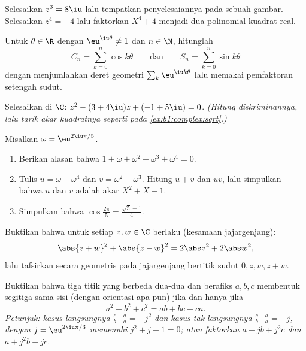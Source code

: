 \begin{exercise}[$\star$]\label{exo:b1:complex:5}
Selesaikan $z^3 = 8\iu$ lalu tempatkan penyelesaiannya pada sebuah gambar. Selesaikan
$z^4 = -4$ lalu faktorkan $X^4 + 4$ menjadi dua polinomial kuadrat real.
\end{exercise}

\begin{exercise}[$\star\star$]\label{exo:b1:complex:6}
Untuk $\theta \in \R$ dengan $\eu^{\iu\theta} \neq 1$ dan $n \in \N$,
hitunglah
\[
C_n = \sum_{k=0}^{n} \cos k\theta
\qquad\text{dan}\qquad
S_n = \sum_{k=0}^{n} \sin k\theta
\]
dengan menjumlahkan deret geometri $\sum_k \eu^{\iu k\theta}$ lalu memakai
pemfaktoran setengah sudut.
\end{exercise}

\begin{exercise}[$\star\star$]\label{exo:b1:complex:7}
Selesaikan di $\C$: $z^2 - (3 + 4\iu) z + (-1 + 5\iu) = 0$. \emph{(Hitung
diskriminannya, lalu tarik akar kuadratnya seperti pada
\cref{ex:b1:complex:sqrt}.)}
\end{exercise}

\begin{exercise}[$\star\star$]\label{exo:b1:complex:8}
Misalkan $\omega = \eu^{2\iu\pi/5}$.
\begin{enumerate}
  \item Berikan alasan bahwa $1 + \omega + \omega^2 + \omega^3 + \omega^4 = 0$.
  \item Tulis $u = \omega + \omega^4$ dan $v = \omega^2 + \omega^3$.
        Hitung $u + v$ dan $uv$, lalu simpulkan bahwa $u$ dan $v$ adalah
        akar $X^2 + X - 1$.
  \item Simpulkan bahwa $\cos\frac{2\pi}{5} = \frac{\sqrt 5 - 1}{4}$.
\end{enumerate}
\end{exercise}

\begin{exercise}[$\star\star$]\label{exo:b1:complex:9}
Buktikan bahwa untuk setiap $z, w \in \C$ berlaku (kesamaan jajargenjang):
\[
\abs{z + w}^2 + \abs{z - w}^2 = 2\abs z^2 + 2\abs w^2 ,
\]
lalu tafsirkan secara geometris pada jajargenjang bertitik sudut $0,
z, w, z + w$.
\end{exercise}

\begin{exercise}[$\star\star\star$]\label{exo:b1:complex:10}
Buktikan bahwa tiga titik yang berbeda dua-dua dan berafiks $a, b, c$ membentuk
segitiga sama sisi (dengan orientasi apa pun) jika dan hanya jika
\[
a^2 + b^2 + c^2 = ab + bc + ca .
\]
\emph{Petunjuk: kasus langsungnya $\frac{c-a}{b-a} = -j^2$ dan
kasus tak langsungnya $\frac{c-a}{b-a} = -j$, dengan $j = \eu^{2\iu\pi/3}$
memenuhi $j^2 + j + 1 = 0$; atau faktorkan $a + jb + j^2c$ dan $a + j^2 b
+ jc$.}
\end{exercise}

